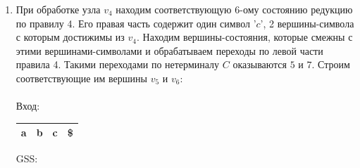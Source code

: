 \begin{example}
\begin{enumerate}
        \\

        \item При обработке узла $v_4$ находим соответствующую 6-ому состоянию редукцию по правилу 4. Его правая часть содержит один символ '$c$', 2 вершины-символа с которым достижимы из $v_4$. Находим вершины-состояния, которые смежны с этими вершинами-символами и обрабатываем переходы по левой части правила 4. Такими переходами по нетерминалу $C$ оказываются $5$ и $7$. Строим соответствующие им вершины $v_5$ и $v_6$:\\ \\
        Вход: \,
        \begin{tabular}[c]{ |c|c|c|c| }
            \hline a & b & c & \$ \\ \hline
        \end{tabular}
        \qquad GSS: \,
        \begin{tikzpicture}[x=0.5pt,y=0.5pt,yscale=-1,xscale=1]



\end{tikzpicture}
\end{enumerate}
\end{example}
